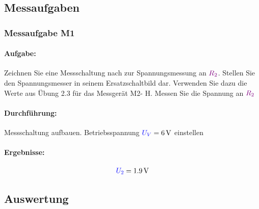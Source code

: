 \documentclass[a4paper,titlepage,parskip]{scrreprt}
\newcommand{\spannung}[1]{\textcolor{blue}{#1}}
\newcommand{\widerstand}[1]{\textcolor{violet}{#1}}
\begin{document}
            \subsection{Messaufgaben}
            \subsubsection{Messaufgabe M1}
            \paragraph{Aufgabe:} Zeichnen Sie eine Messschaltung nach zur Spannungsmessung an $\widerstand{R_2}$.   Stellen Sie den Spannungsmesser in seinem Ersatzschaltbild dar. Verwenden Sie dazu die Werte aus Übung 2.3 für das Messgerät M2- H. Messen Sie  die Spannung an $\widerstand{R_2}$ 
            \paragraph{Durchführung:} Messschaltung aufbauen. Betriebsspannung $\spannung{U_V} = \SI{6}{\volt}$ einstellen
            \paragraph{Ergebnisse:}
                \begin{align*}
                    \spannung{U_2} = \SI{1,9}{\volt}
                \end{align*}
           
            
            \subsection{Auswertung}
\end{document}
